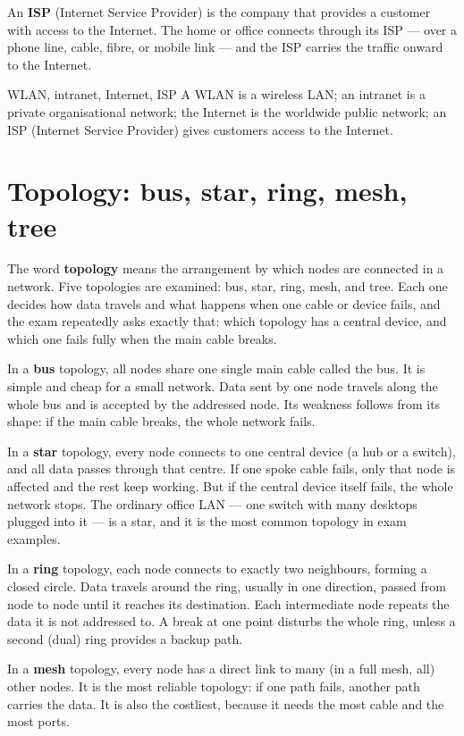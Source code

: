 An \textbf{ISP} (Internet Service Provider) is the company that provides a
customer with access to the Internet. The home or office connects through its
ISP --- over a phone line, cable, fibre, or mobile link --- and the ISP
carries the traffic onward to the Internet.

\begin{definitionbox}{WLAN, intranet, Internet, ISP}
A WLAN is a wireless LAN; an intranet is a private organisational network;
the Internet is the worldwide public network; an ISP (Internet Service
Provider) gives customers access to the Internet.
\end{definitionbox}

\section{Topology: bus, star, ring, mesh, tree}
The word \textbf{topology} means the arrangement by which nodes are connected
in a network. Five topologies are examined: bus, star, ring, mesh, and tree.
Each one decides how data travels and what happens when one cable or device
fails, and the exam repeatedly asks exactly that: which topology has a
central device, and which one fails fully when the main cable breaks.

In a \textbf{bus} topology, all nodes share one single main cable called the
bus. It is simple and cheap for a small network. Data sent by one node
travels along the whole bus and is accepted by the addressed node. Its
weakness follows from its shape: if the main cable breaks, the whole network
fails.

In a \textbf{star} topology, every node connects to one central device (a
hub or a switch), and all data passes through that centre. If one spoke cable
fails, only that node is affected and the rest keep working. But if the
central device itself fails, the whole network stops. The ordinary office LAN
--- one switch with many desktops plugged into it --- is a star, and it is
the most common topology in exam examples.

In a \textbf{ring} topology, each node connects to exactly two neighbours,
forming a closed circle. Data travels around the ring, usually in one
direction, passed from node to node until it reaches its destination. Each
intermediate node repeats the data it is not addressed to. A break at one
point disturbs the whole ring, unless a second (dual) ring provides a backup
path.

In a \textbf{mesh} topology, every node has a direct link to many (in a full
mesh, all) other nodes. It is the most reliable topology: if one path fails,
another path carries the data. It is also the costliest, because it needs the
most cable and the most ports.

